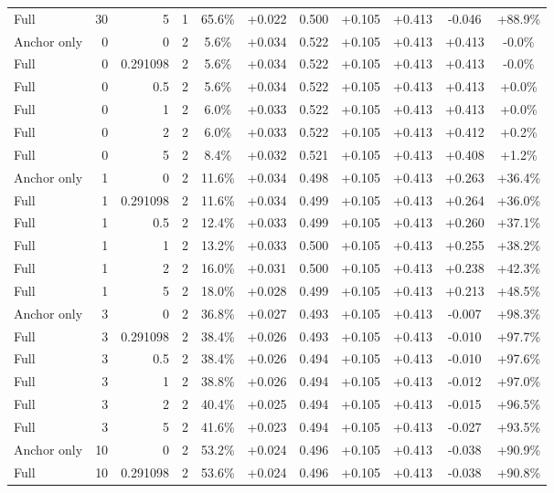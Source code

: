 \begin{table}[htbp]
\begin{tabular}{lrrrccccccc}
Full & 30 & 5 & 1 & 65.6\% & +0.022 & 0.500 & +0.105 & +0.413 & -0.046 & +88.9\% \\
Anchor only & 0 & 0 & 2 & 5.6\% & +0.034 & 0.522 & +0.105 & +0.413 & +0.413 & -0.0\% \\
Full & 0 & 0.291098 & 2 & 5.6\% & +0.034 & 0.522 & +0.105 & +0.413 & +0.413 & -0.0\% \\
Full & 0 & 0.5 & 2 & 5.6\% & +0.034 & 0.522 & +0.105 & +0.413 & +0.413 & +0.0\% \\
Full & 0 & 1 & 2 & 6.0\% & +0.033 & 0.522 & +0.105 & +0.413 & +0.413 & +0.0\% \\
Full & 0 & 2 & 2 & 6.0\% & +0.033 & 0.522 & +0.105 & +0.413 & +0.412 & +0.2\% \\
Full & 0 & 5 & 2 & 8.4\% & +0.032 & 0.521 & +0.105 & +0.413 & +0.408 & +1.2\% \\
Anchor only & 1 & 0 & 2 & 11.6\% & +0.034 & 0.498 & +0.105 & +0.413 & +0.263 & +36.4\% \\
Full & 1 & 0.291098 & 2 & 11.6\% & +0.034 & 0.499 & +0.105 & +0.413 & +0.264 & +36.0\% \\
Full & 1 & 0.5 & 2 & 12.4\% & +0.033 & 0.499 & +0.105 & +0.413 & +0.260 & +37.1\% \\
Full & 1 & 1 & 2 & 13.2\% & +0.033 & 0.500 & +0.105 & +0.413 & +0.255 & +38.2\% \\
Full & 1 & 2 & 2 & 16.0\% & +0.031 & 0.500 & +0.105 & +0.413 & +0.238 & +42.3\% \\
Full & 1 & 5 & 2 & 18.0\% & +0.028 & 0.499 & +0.105 & +0.413 & +0.213 & +48.5\% \\
Anchor only & 3 & 0 & 2 & 36.8\% & +0.027 & 0.493 & +0.105 & +0.413 & -0.007 & +98.3\% \\
Full & 3 & 0.291098 & 2 & 38.4\% & +0.026 & 0.493 & +0.105 & +0.413 & -0.010 & +97.7\% \\
Full & 3 & 0.5 & 2 & 38.4\% & +0.026 & 0.494 & +0.105 & +0.413 & -0.010 & +97.6\% \\
Full & 3 & 1 & 2 & 38.8\% & +0.026 & 0.494 & +0.105 & +0.413 & -0.012 & +97.0\% \\
Full & 3 & 2 & 2 & 40.4\% & +0.025 & 0.494 & +0.105 & +0.413 & -0.015 & +96.5\% \\
Full & 3 & 5 & 2 & 41.6\% & +0.023 & 0.494 & +0.105 & +0.413 & -0.027 & +93.5\% \\
Anchor only & 10 & 0 & 2 & 53.2\% & +0.024 & 0.496 & +0.105 & +0.413 & -0.038 & +90.9\% \\
Full & 10 & 0.291098 & 2 & 53.6\% & +0.024 & 0.496 & +0.105 & +0.413 & -0.038 & +90.8\% \\

\end{tabular}
\end{table}
